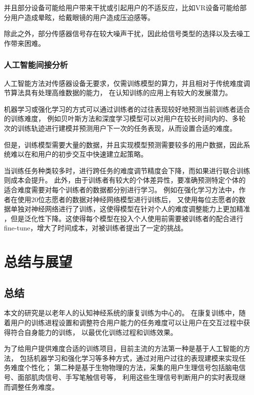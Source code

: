 \documentclass{article}
\begin{document}
            并且部分设备可能给用户带来干扰或引起用户的不适反应，比如VR设备可能给部分用户造成晕眩，给戴眼镜的用户造成压迫感等。

            除此之外，部分传感器信号存在较大噪声干扰，因此给信号类型的选择以及去噪工作带来困难。
            
            \subsubsection{人工智能间接分析}
            人工智能方法对传感器设备无要求，仅需训练模型的算力，并且相对于传统难度调节算法具有处理高维数据的能力，
            在认知训练的应用上有较大的发展潜力。

            机器学习或强化学习的方式可以通过训练者的过往表现较好地预测当前训练者适合的训练难度，
            例如贝叶斯方法和深度学习模型可以对用户在较长时间内的、多轮次的训练轨迹进行建模并预测用户下一次的任务表现，从而设置合适的难度。

            但是，训练模型需要大量的数据，并且实现模型预测需要较多的用户数据，因此系统难以在和用户的初步交互中快速建立起策略。
            
            当训练任务种类较多时，进行跨任务的难度调节精度会下降，而如果进行联合训练则成本会提升。
            此外，由于训练者有较大的个体差异性，要准确预测特定个体的适合难度需要对每个训练者的数据都分别进行学习。
            例如在强化学习方法中，作者在使用20位志愿者的数据对神经网络模型进行训练后，
            又使用每位志愿者的数据单独对神经网络进行了训练，这使得模型在针对个人的难度调整能力上更加精准
            ，但是泛化性下降。这使得每个模型在投入个人使用前需要被训练者的配合进行fine-tune，增大了时间成本，对被训练者提出了一定的挑战。
            






    \section{总结与展望}
    \subsection{总结}
    本文的研究是以老年人的认知神经系统的康复训练为中心的。
    在康复训练中，随着用户的训练进程设置和调整符合用户能力的任务难度可以让用户在交互过程中获得符合自身能力的训练，
    以最优化训练过程和训练效果。
    
    为了给用户提供难度合适的训练项目，目前主流的方法第一种是基于人工智能的方法，
    包括机器学习和强化学习等多种方式，通过对用户过往的表现建模来实现任务难度个性化；
    第二种是基于生物物理的方法，采集的用户生理信号包括脑电信号、面部肌肉信号、手写笔触信号等，
    利用这些生理信号判断用户的实时表现继而调整任务难度。
\end{document}
